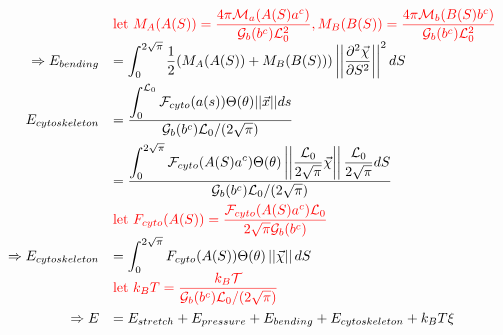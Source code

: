 \[\begin{array}{rl}
& \textcolor{red}{\text{let } M_A(A(S))= \dfrac{ 4 \pi \mathcal{M}_a(A(S)a^c) }{\mathcal{G}_b(b^c)\mathcal{L}_0^2}, M_B(B(S)) = \dfrac{ 4 \pi \mathcal{M}_b(B(S)b^c) }{\mathcal{G}_b(b^c)\mathcal{L}_0^2}}\\
\Rightarrow E_{bending} &= \displaystyle\int_0^{2\sqrt{\pi}} \dfrac{1}{2 } (M_A(A(S))+ M_B(B(S)))\left|\left| \dfrac{\partial^2 \vec{\chi}}{\partial S^2} \right|\right|^2 dS\\[10pt]
 
E_{cytoskeleton} &= \dfrac{\displaystyle\int_0^{\mathcal{L}_0} \mathcal{F}_{cyto} (a(s))\Theta (\theta) || \vec{x} || ds}{\mathcal{G}_b(b^c) \mathcal{L}_0/(2\sqrt{\pi})} \\[10pt]

&= \dfrac{\displaystyle\int_0^{2\sqrt{\pi}} \mathcal{F}_{cyto} (A(S)a^c)\Theta (\theta) \left|\left| \dfrac{\mathcal{L}_0}{2\sqrt{\pi}}\vec{\chi} \right|\right| \dfrac{\mathcal{L}_0}{2\sqrt{\pi}} dS}{\mathcal{G}_b(b^c) \mathcal{L}_0/(2\sqrt{\pi})} \\[10pt]
& \textcolor{red}{\text{let } F_{cyto}(A(S)) = \dfrac{\mathcal{F}_{cyto} (A(S)a^c)\mathcal{L}_0}{2\sqrt{\pi}\mathcal{G}_b(b^c)}}\\
\Rightarrow E_{cytoskeleton} &= \displaystyle\int_0^{2\sqrt{\pi}} F_{cyto}(A(S))\Theta (\theta) \left|\left| \vec{\chi} \right|\right| dS\\

 & \textcolor{red}{\text{let } k_B T = \dfrac{k_B\mathcal{T}}{\mathcal{G}_b(b^c) \mathcal{L}_0/(2\sqrt{\pi})}} \\[10pt]
 
 \Rightarrow E &= E_{stretch} + E_{pressure}  + E_{bending}  + E_{cytoskeleton}  + k_BT \xi\\



\end{array}\]



